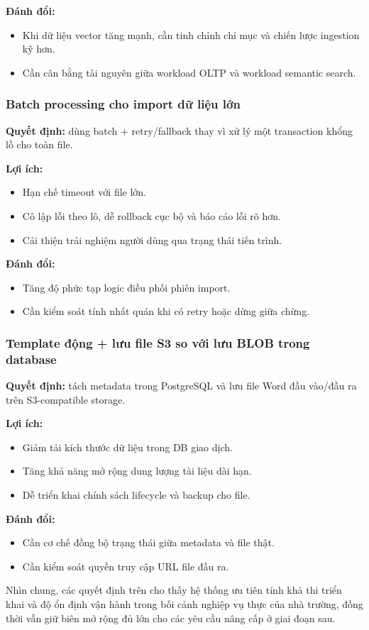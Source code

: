 \textbf{Đánh đổi:}
\begin{itemize}
	\item Khi dữ liệu vector tăng mạnh, cần tinh chỉnh chỉ mục và chiến lược ingestion kỹ hơn.
	\item Cần cân bằng tài nguyên giữa workload OLTP và workload semantic search.
\end{itemize}

\subsubsection{Batch processing cho import dữ liệu lớn}
\textbf{Quyết định:} dùng batch + retry/fallback thay vì xử lý một transaction khổng lồ cho toàn file.

\textbf{Lợi ích:}
\begin{itemize}
	\item Hạn chế timeout với file lớn.
	\item Cô lập lỗi theo lô, dễ rollback cục bộ và báo cáo lỗi rõ hơn.
	\item Cải thiện trải nghiệm người dùng qua trạng thái tiến trình.
\end{itemize}

\textbf{Đánh đổi:}
\begin{itemize}
	\item Tăng độ phức tạp logic điều phối phiên import.
	\item Cần kiểm soát tính nhất quán khi có retry hoặc dừng giữa chừng.
\end{itemize}

\subsubsection{Template động + lưu file S3 so với lưu BLOB trong database}
\textbf{Quyết định:} tách metadata trong PostgreSQL và lưu file Word đầu vào/đầu ra trên S3-compatible storage.

\textbf{Lợi ích:}
\begin{itemize}
	\item Giảm tải kích thước dữ liệu trong DB giao dịch.
	\item Tăng khả năng mở rộng dung lượng tài liệu dài hạn.
	\item Dễ triển khai chính sách lifecycle và backup cho file.
\end{itemize}

\textbf{Đánh đổi:}
\begin{itemize}
	\item Cần cơ chế đồng bộ trạng thái giữa metadata và file thật.
	\item Cần kiểm soát quyền truy cập URL file đầu ra.
\end{itemize}

Nhìn chung, các quyết định trên cho thấy hệ thống ưu tiên tính khả thi triển khai và độ ổn định vận hành trong bối cảnh nghiệp vụ thực của nhà trường, đồng thời vẫn giữ biên mở rộng đủ lớn cho các yêu cầu nâng cấp ở giai đoạn sau.

\clearpage